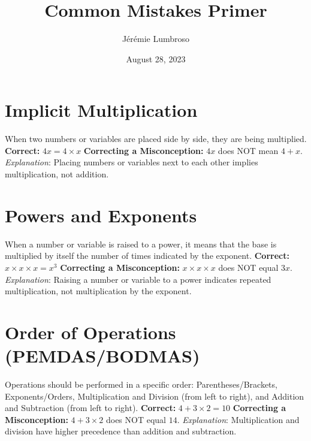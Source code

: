 \documentclass[12pt]{article}
\title{Common Mistakes Primer}
\author{Jérémie Lumbroso}
\date{August 28, 2023}
\newenvironment{correct}{\noindent\textbf{Correct:}}{}
\newenvironment{misconception}{\noindent\textbf{Correcting a Misconception:}}{}
\newenvironment{explanation}{\noindent\textit{Explanation}:}{\vspace{1em}}
\begin{document}
\maketitle

\section*{Implicit Multiplication}
When two numbers or variables are placed side by side, they are being multiplied.
\begin{correct} \(4x = 4 \times x\) \end{correct}
\begin{misconception} \(4x\) does NOT mean \(4 + x\). \end{misconception}
\begin{explanation} Placing numbers or variables next to each other implies multiplication, not addition. \end{explanation}

\section*{Powers and Exponents}
When a number or variable is raised to a power, it means that the base is multiplied by itself the number of times indicated by the exponent.
\begin{correct} \(x \times x \times x = x^3\) \end{correct}
\begin{misconception} \(x \times x \times x\) does NOT equal \(3x\). \end{misconception}
\begin{explanation} Raising a number or variable to a power indicates repeated multiplication, not multiplication by the exponent. \end{explanation}

\section*{Order of Operations (PEMDAS/BODMAS)}
Operations should be performed in a specific order: Parentheses/Brackets, Exponents/Orders, Multiplication and Division (from left to right), and Addition and Subtraction (from left to right).
\begin{correct} \(4 + 3 \times 2 = 10\) \end{correct}
\begin{misconception} \(4 + 3 \times 2\) does NOT equal \(14\). \end{misconception}
\begin{explanation} Multiplication and division have higher precedence than addition and subtraction. \end{explanation}
\end{document}
